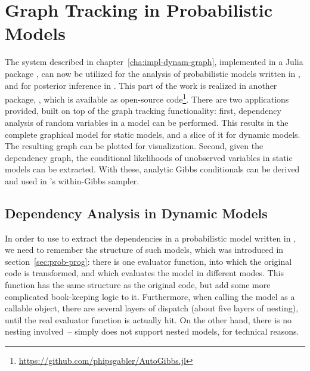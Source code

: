 \chapter{Graph Tracking in Probabilistic Models}
\label{cha:graph-track-prob}

The system described in chapter~\ref{cha:impl-dynam-graph}, implemented in a Julia package
\irtrackerjl{}, can now be utilized for the analysis of probabilistic models written in \dppljl{},
and for posterior inference in \turingjl{}.  This part of the work is realized in another package,
\autogibbsjl{}, which is available as open-source
code\footnote{\url{https://github.com/phipsgabler/AutoGibbs.jl}}.  There are two applications
provided, built on top of the graph tracking functionality: first, dependency analysis of random
variables in a model can be performed.  This results in the complete graphical model for static
models, and a slice of it for dynamic models.  The resulting graph can be plotted for visualization.
Second, given the dependency graph, the conditional likelihoods of unobserved variables in static
models can be extracted.  With these, analytic Gibbs conditionals can be derived and used in
\turingjl{}'s within-Gibbs sampler.

\section{Dependency Analysis in Dynamic Models}
\label{sec:dependency-analysis}

In order to use \irtrackerjl{} to extract the dependencies in a probabilistic model written in
\dppljl{}, we need to remember the structure of such models, which was introduced in
section~\ref{sec:prob-prog}: there is one evaluator function, into which the original code is
transformed, and which evaluates the model in different modes.  This function has the same structure
as the original code, but add some more complicated book-keeping logic to it.  Furthermore, when
calling the model as a callable object, there are several layers of dispatch (about five layers of
nesting), until the real evaluator function is actually hit.  On the other hand, there is no nesting
involved~-- \turingjl{} simply does not support nested models, for technical reasons.

